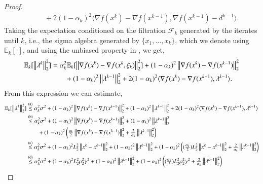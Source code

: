 \begin{toappendix}
\begin{proof}
\begin{equation*}
\begin{aligned}
                    &\quad\quad +2(1-\alpha_k)^2\langle \nabla f(x^k)-\nabla f(x^{k-1}),\nabla f(x^{k-1}) - d^{k-1}\rangle.
        \end{aligned}
    \end{equation*}
    Taking the expectation conditioned on the filtration $\mathcal{F}_k$ generated by the iterates until $k$, i.e., the sigma algebra generated by $\{x_1,\ldots,x_k\}$, which we denote using $\mathbb{E}_k[\cdot]$, and using the unbiased property in , we get,
    \begin{equation*}
        \begin{aligned}
            \mathbb{E}_k[\left\Vert{\lambda^k}\right\Vert_2^2]
                &= \alpha_k^2\mathbb{E}_k[\left\Vert{\nabla f(x^k)-\nabla f(x^k,\xi_k)}\right\Vert_2^2] + (1-\alpha_k)^2\left\Vert{\nabla f(x^k)-\nabla f(x^{k-1})}\right\Vert_2^2\\
                    &\quad\quad + (1-\alpha_k)^2\left\Vert{\lambda^{k-1}}\right\Vert_2^2 + 2(1-\alpha_k)^2\langle \nabla f(x^k)-\nabla f(x^{k-1}),\lambda^{k-1}\rangle.
        \end{aligned}
    \end{equation*}
    From this expression we can estimate,
    \begin{equation*}
        \begin{aligned}
            \mathbb{E}_k[\norm{\lambda^k}_2^2]
                &\stackrel{\text{(a)}}{\leq} \alpha_k^2\sigma^2 + (1-\alpha_k)^2\norm{\nabla f(x^{k})-\nabla f(x^{k-1})}_2^2 + (1-\alpha_k)^2\norm{\lambda^{k-1}}_2^2 + 2(1-\alpha_k)^2\langle \nabla f(x^k)-\nabla f(x^{k-1}),\lambda^{k-1}\rangle\\
                &\stackrel{\text{(b)}}{\leq} \alpha_k^2\sigma^2 + (1-\alpha_k)^2\norm{\nabla f(x^{k})-\nabla f(x^{k-1})}_2^2 + (1-\alpha_k)^2\norm{\lambda^{k-1}}_2^2\\
                    &\quad\quad + (1-\alpha_k)^2\left(\tfrac{\alpha_k}{2}\norm{\nabla f(x^k)-\nabla f(x^{k-1})}_2^2+\tfrac{2}{\alpha_k}\norm{\lambda^{k-1}}_2^2\right)\\
                 &\stackrel{\text{(c)}}{\leq} \alpha_k^2\sigma^2 + (1-\alpha_k)^2L_2^2\norm{x^k-x^{k-1}}_2^2 + (1-\alpha_k)^2\norm{\lambda^{k-1}}_2^2 + (1-\alpha_k)^2\left((\tfrac{\alpha_k}{2})L_2^2\norm{x^k-x^{k-1}}_{2}^2+\tfrac{2}{\alpha_k}\norm{\lambda^{k-1}}_2^2\right)\\
                 &\stackrel{\text{(d)}}{\leq} \alpha_k^2\sigma^2 + (1-\alpha_k)^2L_2^2\rho_2^2\gamma^2 + (1-\alpha_k)^2\norm{\lambda^{k-1}}_2^2 + (1-\alpha_k)^2\left((\tfrac{\alpha_k}{2})L_2^2\rho_2^2\gamma^2+\tfrac{2}{\alpha_k}\norm{\lambda^{k-1}}_2^2\right)\\

\end{aligned}
\end{equation*}
\end{proof}
\end{toappendix}
